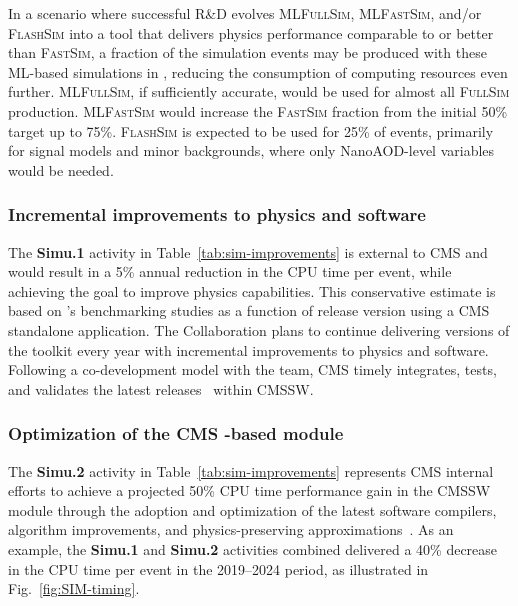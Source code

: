In a scenario where successful R\&D evolves \textsc{MLFullSim}, \textsc{MLFastSim}, and/or \textsc{FlashSim} into a tool that delivers physics performance comparable to or better than \textsc{FastSim}, a fraction of the simulation events may be produced with these \gls{ML}-based simulations in \RunFour, reducing the consumption of computing resources even further.
\textsc{MLFullSim}, if sufficiently accurate, would be used for almost all \textsc{FullSim} production.
\textsc{MLFastSim} would increase the \textsc{FastSim} fraction from the initial 50\% target up to 75\%.
\textsc{FlashSim} is expected to be used for 25\% of events, primarily for signal models and minor backgrounds, where only NanoAOD-level variables would be needed.

\subsubsection{Incremental improvements to \GEANTfour physics and software}

The \textbf{Simu.1} activity in Table~\ref{tab:sim-improvements} is external to CMS and would result in a 5\% annual reduction in the \gls{CPU} time per event, while achieving the goal to improve physics capabilities. This conservative estimate is based on \GEANTfour's benchmarking studies as a function of release version using a CMS standalone application. The \GEANTfour Collaboration plans to continue delivering versions of the toolkit every year with incremental improvements to physics and software. Following a co-development model with the \GEANTfour team, CMS timely integrates, tests, and validates the latest \GEANTfour releases~\cite{CMS:2021dly} within \gls{CMSSW}. 

\subsubsection{Optimization of the CMS \GEANTfour-based module}

The \textbf{Simu.2} activity in Table~\ref{tab:sim-improvements} represents CMS internal efforts to achieve a projected 50\% \gls{CPU} time performance gain in the \gls{CMSSW} \GEANTfour module through the adoption and optimization of the latest software compilers, algorithm improvements, and physics-preserving approximations~\cite{Hildreth:2015kps, Srimanobhas:2024nmy}. As an example, the \textbf{Simu.1} and \textbf{Simu.2} activities combined delivered a 40\% decrease in the \gls{CPU} time per event in the 2019--2024 period, as illustrated in Fig.~\ref{fig:SIM-timing}.

